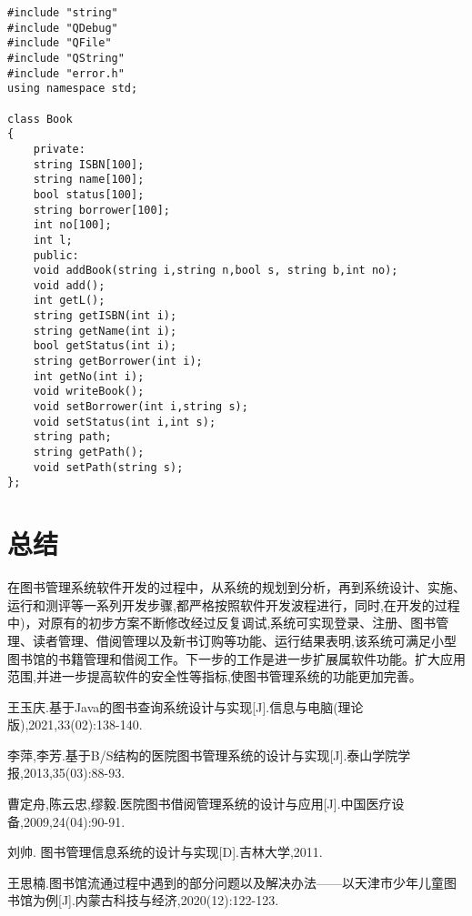 \documentclass[forprint]{shmtu}
\begin{document}
\begin{lstlisting}
#include "string"
#include "QDebug"
#include "QFile"
#include "QString"
#include "error.h"
using namespace std;

class Book
{
	private:
	string ISBN[100];
	string name[100];
	bool status[100];
	string borrower[100];
	int no[100];
	int l;
	public:
	void addBook(string i,string n,bool s, string b,int no);
	void add();
	int getL();
	string getISBN(int i);
	string getName(int i);
	bool getStatus(int i);
	string getBorrower(int i);
	int getNo(int i);
	void writeBook();
	void setBorrower(int i,string s);
	void setStatus(int i,int s);
	string path;
	string getPath();
	void setPath(string s);
};
\end{lstlisting}

\chapter{总结}

在图书管理系统软件开发的过程中，从系统的规划到分析，再到系统设计、实施、运行和测评等一系列开发步骤,都严格按照软件开发波程进行，同时,在开发的过程中)，对原有的初步方案不断修改经过反复调试,系统可实现登录、注册、图书管理、读者管理、借阅管理以及新书订购等功能、运行结果表明,该系统可满足小型图书馆的书籍管理和借阅工作。下一步的工作是进一步扩展属软件功能。扩大应用范围,并进一步提高软件的安全性等指标,使图书管理系统的功能更加完善。

\cleardoublepage{}
{}
\begin{thebibliography}{99}

   王玉庆.基于Java的图书查询系统设计与实现[J].信息与电脑(理论版),2021,33(02):138-140.

   李萍,李芳.基于B/S结构的医院图书管理系统的设计与实现[J].泰山学院学报,2013,35(03):88-93.

   曹定舟,陈云忠,缪毅.医院图书借阅管理系统的设计与应用[J].中国医疗设备,2009,24(04):90-91.

   刘帅. 图书管理信息系统的设计与实现[D].吉林大学,2011.

   王思楠.图书馆流通过程中遇到的部分问题以及解决办法——以天津市少年儿童图书馆为例[J].内蒙古科技与经济,2020(12):122-123.
\end{thebibliography}


\appendix
\end{document}
